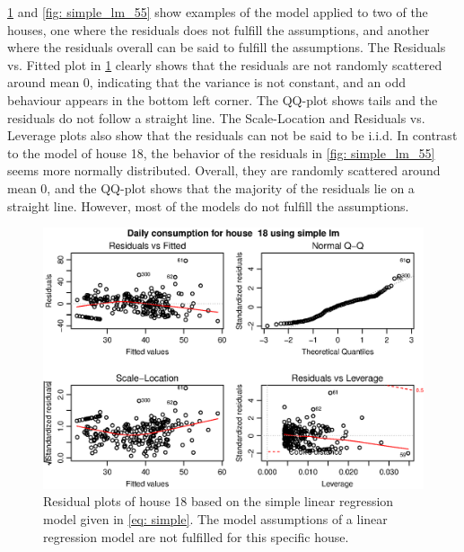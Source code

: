 \noindent \cref{fig: simple_lm_18} and \cref{fig: simple_lm_55} show examples of the model applied to two of the houses, one where the residuals does not fulfill the assumptions, and another where the residuals overall can be said to fulfill the assumptions. The Residuals vs. Fitted plot in \cref{fig: simple_lm_18} clearly shows that the residuals are not randomly scattered around mean 0, indicating that the variance is not constant, and an odd behaviour appears in the bottom left corner. The QQ-plot shows tails and the residuals do not follow a straight line. The Scale-Location and Residuals vs. Leverage plots also show that the residuals can not be said to be i.i.d. In contrast to the model of house 18, the behavior of the residuals in \cref{fig: simple_lm_55} seems more normally distributed. Overall, they are randomly scattered around mean 0, and the QQ-plot shows that the majority  of the residuals lie on a straight line. However, most of the models do not fulfill the assumptions.
\begin{figure}
    \centering
    \includegraphics[width=1.\textwidth]{../../../figures/simple_lm18.eps}
    \caption{Residual plots of house 18 based on the simple linear regression model given in \cref{eq: simple}. The model assumptions of a linear regression model are not fulfilled for this specific house.}
    \label{fig: simple_lm_18}
\end{figure}
